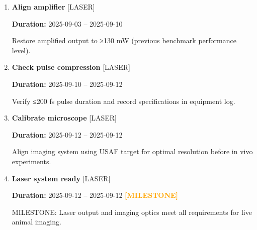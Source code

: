 \documentclass[landscape,a4paper]{article}
\begin{document}
\begin{enumerate}[leftmargin=1.5cm, itemsep=1em]
    \item \textcolor{researchexp}{\textbf{\large Align amplifier}}
          \hfill \textcolor{black!60}{\small [LASER]}
          
          \vspace{0.2em}
          \textcolor{black!70}{\textbf{Duration:} 2025-09-03 -- 2025-09-10}

          \vspace{0.4em}
          \begin{minipage}[t]{0.9\textwidth}
          \textcolor{black!85}{Restore amplified output to ≥130 mW (previous benchmark performance level).}
          \end{minipage}


    \item \textcolor{researchexp}{\textbf{\large Check pulse compression}}
          \hfill \textcolor{black!60}{\small [LASER]}
          
          \vspace{0.2em}
          \textcolor{black!70}{\textbf{Duration:} 2025-09-10 -- 2025-09-12}

          \vspace{0.4em}
          \begin{minipage}[t]{0.9\textwidth}
          \textcolor{black!85}{Verify ≤200 fs pulse duration and record specifications in equipment log.}
          \end{minipage}


    \item \textcolor{researchexp}{\textbf{\large Calibrate microscope}}
          \hfill \textcolor{black!60}{\small [LASER]}
          
          \vspace{0.2em}
          \textcolor{black!70}{\textbf{Duration:} 2025-09-12 -- 2025-09-12}

          \vspace{0.4em}
          \begin{minipage}[t]{0.9\textwidth}
          \textcolor{black!85}{Align imaging system using USAF target for optimal resolution before in vivo experiments.}
          \end{minipage}


    \item \textcolor{researchexp}{\textbf{\large Laser system ready}}
          \hfill \textcolor{black!60}{\small [LASER]}
          
          \vspace{0.2em}
          \textcolor{black!70}{\textbf{Duration:} 2025-09-12 -- 2025-09-12}
          \textcolor{orange}{\textbf{ [MILESTONE]}}\n
          \vspace{0.4em}
          \begin{minipage}[t]{0.9\textwidth}
          \textcolor{black!85}{MILESTONE: Laser output and imaging optics meet all requirements for live animal imaging.}
          \end{minipage}



\end{enumerate}
\end{document}
